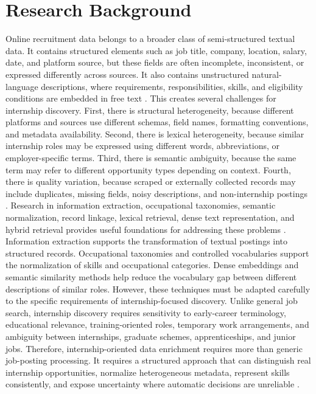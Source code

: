 \section{Research Background}
Online recruitment data belongs to a broader class of semi-structured textual data. It contains
structured elements such as job title, company, location, salary, date, and platform source, but
these fields are often incomplete, inconsistent, or expressed differently across sources. It also
contains unstructured natural-language descriptions, where requirements, responsibilities, skills,
and eligibility conditions are embedded in free text \cite{doan2012principles, batini2009methodologies}.
This creates several challenges for internship discovery. First, there is structural heterogeneity,
because different platforms and sources use different schemas, field names, formatting
conventions, and metadata availability. Second, there is lexical heterogeneity, because similar
internship roles may be expressed using different words, abbreviations, or employer-specific
terms. Third, there is semantic ambiguity, because the same term may refer to different
opportunity types depending on context. Fourth, there is quality variation, because scraped or
externally collected records may include duplicates, missing fields, noisy descriptions, and non-internship postings
\cite{batini2009methodologies, elmagarmid2007duplicate}.
Research in information extraction, occupational taxonomies, semantic normalization, record
linkage, lexical retrieval, dense text representation, and hybrid retrieval provides useful
foundations for addressing these problems \cite{sarawagi2008information, peterson2001occupational, manning2008introduction, luan2021sparse}. Information extraction supports the transformation of
textual postings into structured records. Occupational taxonomies and controlled vocabularies
support the normalization of skills and occupational categories. Dense embeddings and semantic
similarity methods help reduce the vocabulary gap between different descriptions of similar
roles. However, these techniques must be adapted carefully to the specific requirements of
internship-focused discovery.
Unlike general job search, internship discovery requires sensitivity to early-career terminology,
educational relevance, training-oriented roles, temporary work arrangements, and ambiguity
between internships, graduate schemes, apprenticeships, and junior jobs. Therefore, internship-oriented data enrichment requires more than generic job-posting processing. It requires a
structured approach that can distinguish real internship opportunities, normalize heterogeneous
metadata, represent skills consistently, and expose uncertainty where automatic decisions are
unreliable \cite{hunkenschroer2022ethics}.

